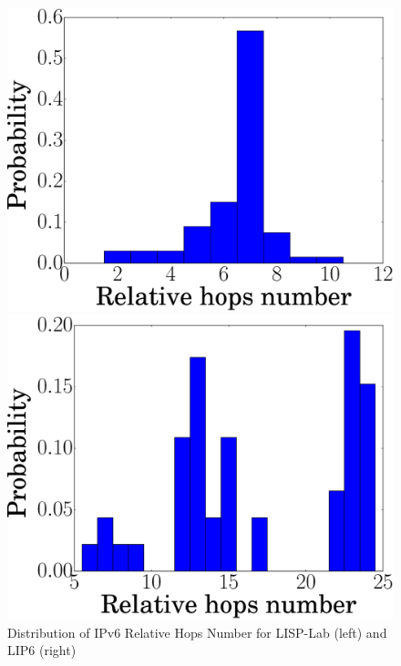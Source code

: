\begin{figure}[!t]
	\begin{minipage}[c]{.49\linewidth}
		\begin{center}
			\includegraphics[width=\textwidth]{Pics/v6/Relative_hops_num_LISP-Lab-FranceIX_hist_changed_60.eps}
		\end{center}
	\end{minipage}
	\begin{minipage}[c]{.49\linewidth}
		\begin{center}
			\includegraphics[width=\textwidth]{Pics/v6/Relative_hops_num_LIP6-FranceIX_hist_changed_60.eps}
		\end{center}
	\end{minipage}
	\vspace{-0.5mm}
	\caption{Distribution of IPv6 Relative Hops Number for LISP-Lab (left) and LIP6 (right)}
	\label{Distribution_v6_relative_hops_num_proporation_LISP-Lab_LIP6}
\end{figure}

